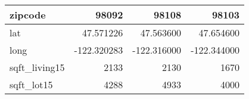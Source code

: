 \begin{table}[H]
\begin{tabular}{|l|r|r|r|}
\hline zipcode & \cellcolor[rgb]{0.9, 0.54, 0.52} 98092 & 98108 & 98103 \\
\hline lat & \cellcolor[rgb]{0.9, 0.54, 0.52} 47.571226 & 47.563600 & 47.654600 \\
\hline long & \cellcolor[rgb]{0.9, 0.54, 0.52} -122.320283 & \cellcolor[rgb]{0.9, 0.54, 0.52} -122.316000 & \cellcolor[rgb]{0.9, 0.54, 0.52} -122.344000 \\
\hline sqft\_living15 & \cellcolor[rgb]{0.9, 0.54, 0.52} 2133 & 2130 & 1670 \\
\hline sqft\_lot15 & \cellcolor[rgb]{0.9, 0.54, 0.52} 4288 & 4933 & 4000 \\
\hline
\end{tabular}
\end{table}
